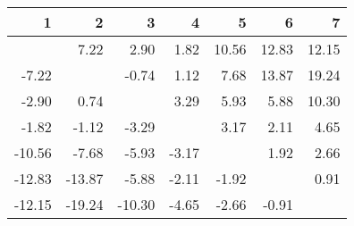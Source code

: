 \begin{table}[ht]
\centering
\begin{tabular}{rrrrrrr}
  \hline
1 & 2 & 3 & 4 & 5 & 6 & 7 \\ 
  \hline
 & 7.22 & 2.90 & 1.82 & 10.56 & 12.83 & 12.15 \\ 
  -7.22 &  & -0.74 & 1.12 & 7.68 & 13.87 & 19.24 \\ 
  -2.90 & 0.74 &  & 3.29 & 5.93 & 5.88 & 10.30 \\ 
  -1.82 & -1.12 & -3.29 &  & 3.17 & 2.11 & 4.65 \\ 
  -10.56 & -7.68 & -5.93 & -3.17 &  & 1.92 & 2.66 \\ 
  -12.83 & -13.87 & -5.88 & -2.11 & -1.92 &  & 0.91 \\ 
  -12.15 & -19.24 & -10.30 & -4.65 & -2.66 & -0.91 &  \\ 
   \hline
\end{tabular}
\end{table}

